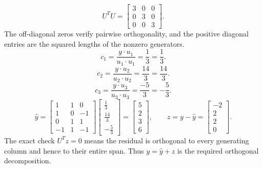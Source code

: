 \[U^TU=\left[\begin{array}{rrr}3&0&0\\0&3&0\\0&0&3\end{array}\right].\]
The off-diagonal zeros verify pairwise orthogonality, and the positive diagonal entries are the squared lengths of the nonzero generators.
\[c_{1}=\frac{y\cdot u_{1}}{u_{1}\cdot u_{1}}=\frac{1}{3}=\frac{1}{3}.\]
\[c_{2}=\frac{y\cdot u_{2}}{u_{2}\cdot u_{2}}=\frac{14}{3}=\frac{14}{3}.\]
\[c_{3}=\frac{y\cdot u_{3}}{u_{3}\cdot u_{3}}=\frac{-5}{3}=- \frac{5}{3}.\]
\[\widehat y=\left[\begin{array}{rrr}1&1&0\\1&0&-1\\0&1&1\\-1&1&-1\end{array}\right]\left[\begin{array}{r}\frac{1}{3}\\\frac{14}{3}\\- \frac{5}{3}\end{array}\right]=\left[\begin{array}{r}5\\2\\3\\6\end{array}\right],\qquad z=y-\widehat y=\left[\begin{array}{r}-2\\2\\2\\0\end{array}\right].\]
The exact check $U^Tz=0$ means the residual is orthogonal to every generating column and hence to their entire span. Thus $y=\widehat y+z$ is the required orthogonal decomposition.


